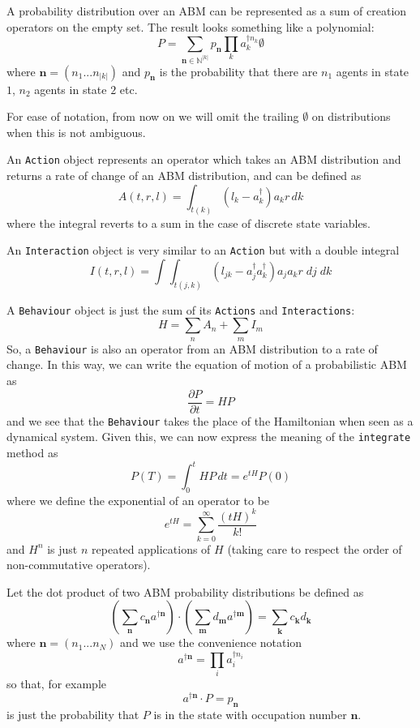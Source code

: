 \documentclass[letterpaper,twocolumn,10pt]{article}
\begin{document}
A probability distribution over an ABM can be represented as a sum of creation operators on the empty set. The result looks something like a polynomial:
\[
P = \sum_{\mathbf{n}\in \mathbb{N}^{|k|}} p_\mathbf{n} \prod_k a_k^{\dag n_k}\emptyset
\]
where $\mathbf{n} = (n_1...n_{|k|})$ and $p_\mathbf{n}$ is the probability that there are $n_1$ agents in state $1$, $n_2$ agents in state $2$ etc.

For ease of notation, from now on we will omit the trailing $\emptyset$ on distributions when this is not ambiguous.


An \texttt{Action} object represents an operator which takes an ABM distribution and returns a rate of change of an ABM distribution, and can be defined as
\[
A(t,r,l) = \int_{t(k)} (l_k - a_k^\dag)a_kr \,dk
\] 
where the integral reverts to a sum in the case of discrete state variables.

An \texttt{Interaction} object is very similar to an \texttt{Action} but with a double integral
\[
I(t,r,l) = \int \int_{t(j,k)} (l_{jk} - a_j^\dag a_k^\dag)a_j a_k r\;  dj\; dk
\] 

A \texttt{Behaviour} object is just the sum of its \texttt{Actions} and \texttt{Interactions}:
\[
H = \sum_n A_n + \sum_m I_m
\]
So, a \texttt{Behaviour} is also an operator from an ABM distribution to a rate of change. In this way, we can write the equation of motion of a probabilistic ABM as
\[
\frac{\partial P}{\partial t} = HP
\]
and we see that the \texttt{Behaviour} takes the place of the Hamiltonian when seen as a dynamical system. Given this, we can now express the meaning of the \texttt{integrate} method as
\begin{equation}
P(T) = \int_0^t HP \, dt = e^{tH}P(0)
\label{mastereq}
\end{equation}
where we define the exponential of an operator to be
\[
e^{tH} = \sum_{k=0}^\infty \frac{(tH)^k}{k!}
\]
and $H^n$ is just $n$ repeated applications of $H$ (taking care to respect the order of non-commutative operators).

Let the dot product of two ABM probability distributions be defined as
\[
\left(\sum_\mathbf{n} c_\mathbf{n} a^{\dag \mathbf{n}}\right) \cdot \left(\sum_\mathbf{m} d_\mathbf{m} a^{\dag \mathbf{m}}\right) = \sum_\mathbf{k} c_\mathbf{k}d_\mathbf{k}
\]
where $\mathbf{n} = (n_1...n_N)$ and we use the convenience notation
\[
a^{\dag \mathbf{n}} = \prod_i a_i^{\dag n_i}
\]
so that, for example
\[
a^{\dag \mathbf{n}} \cdot P = p_\mathbf{n}
\]
is just the probability that $P$ is in the state with occupation number $\mathbf{n}$.
\end{document}
